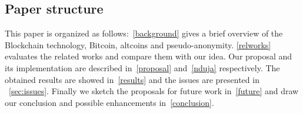 \subsection{Paper structure}
This paper is organized as follows:~\autoref{background} gives a brief
overview of the Blockchain technology, Bitcoin, altcoins and pseudo-anonymity.
\autoref{relworks} evaluates the related works and compare them
with our idea. Our proposal and its implementation are described
in~\autoref{proposal} and~\autoref{nduja} respectively.
The obtained results are showed in~\autoref{results} and the issues
are presented in ~\autoref{sec:issues}.
Finally we sketch the proposals for future work in~\autoref{future} and draw
our conclusion and possible enhancements in~\autoref{conclusion}.

